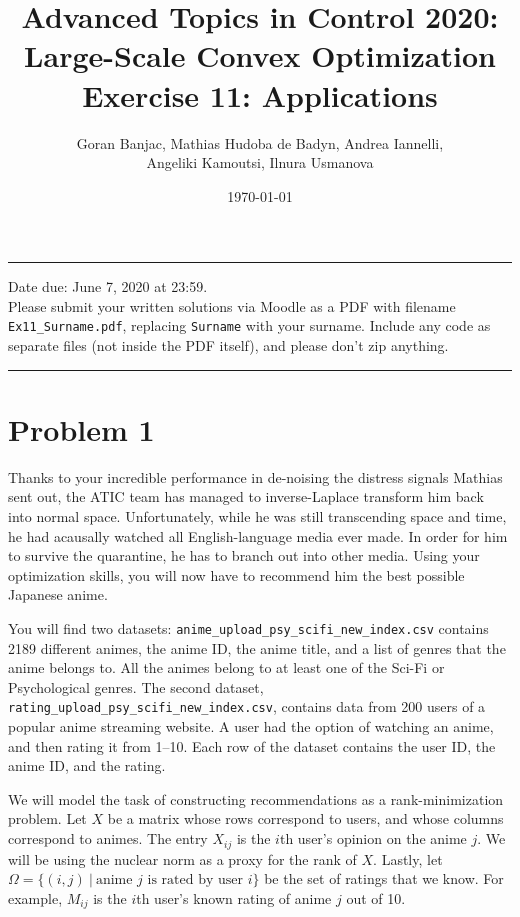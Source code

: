 \documentclass[11pt,a4paper]{article}
\title{%
    \textbf{Advanced Topics in Control 2020: \\ Large-Scale Convex Optimization} \\[.5em]
    Exercise 11: Applications
}
\author{Goran Banjac, Mathias Hudoba de Badyn, Andrea Iannelli, \\ Angeliki Kamoutsi, Ilnura Usmanova}
\date{\today}
\begin{document}
\maketitle
\hrule
\vspace{0.3cm}
\noindent Date due: June 7, 2020 at 23:59.\\

\noindent Please submit your written solutions via Moodle as a PDF with filename \texttt{Ex11\_Surname.pdf}, replacing \texttt{Surname} with your surname. Include any code as separate files (not inside the PDF itself), and please don't zip anything.
\vspace{0.3cm}
\hrule
\vspace{0.5cm}


\section{Problem 1}

Thanks to your incredible performance in de-noising the distress signals Mathias sent out, the ATIC team has managed to inverse-Laplace transform him back into normal space.
Unfortunately, while he was still transcending space and time, he had acausally watched all English-language media ever made.
In order for him to survive the quarantine, he has to branch out into other media.
Using your optimization skills, you will now have to recommend him the best possible Japanese anime.
\medskip

You will find two datasets: \texttt{anime\_upload\_psy\_scifi\_new\_index.csv} contains 2189 different animes, the anime ID, the anime title, and a list of genres that the anime belongs to.
All the animes belong to at least one of the Sci-Fi or Psychological genres.
The second dataset, \texttt{rating\_upload\_psy\_scifi\_new\_index.csv}, contains data from 200 users of a popular anime streaming website.
A user had the option of watching an anime, and then rating it from 1--10. 
Each row of the dataset contains the user ID, the anime ID, and the rating.
\medskip

We will model the task of constructing recommendations as a rank-minimization problem.
Let $X$ be a matrix whose rows correspond to users, and whose columns correspond to animes.
The entry $X_{ij}$ is the $i$th user's opinion on the anime $j$.
We will be using the nuclear norm as a proxy for the rank of $X$.
Lastly, let $\Omega =\{(i,j)~|~\text{anime $j$ is rated by user $i$}\}$ be the set of ratings that we know.
For example, $M_{ij}$ is the $i$th user's known rating of anime $j$ out of 10.
\end{document}
